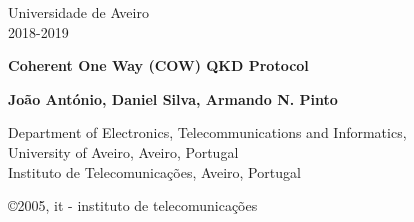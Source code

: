 \documentclass[5pt]{article}
\newcommand{\br}[1]{{\textbf{\color{itred} #1}}}%
\begin{document}
\begin{titlepage}  

\color{itblue} \sffamily \noindent \small
\hspace*{1cm}  Universidade de Aveiro\\ %
\hspace*{1cm}  2018-2019\\ 

\vspace*{1cm}
\begin{center}
    \color{black} \sffamily \noindent \Large
    \br{Coherent One Way (COW) QKD Protocol \\}
\end{center}
\vspace{6mm}
\begin{center}
    \color{black}
    \textbf{João António, Daniel Silva, Armando N. Pinto\\}
    {}
\end{center}

\vspace{0.0mm}
\scriptsize
\begin{center}
Department of Electronics, Telecommunications and Informatics,\\
University of Aveiro, Aveiro, Portugal\\
Instituto de Telecomunica\c{c}\~{o}es, Aveiro, Portugal\\
\end{center}

\vspace{1.0cm}
\hspace*{13.2cm}\tiny \copyright 2005, it - instituto de telecomunica\c{c}\~{o}es\hfill

\end{titlepage}


\renewcommand{\headsep}{-25pt}

\end{document}
